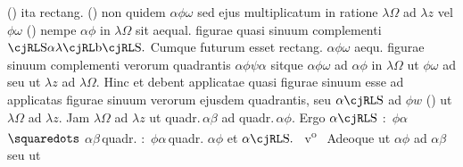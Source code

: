 \phantom(\hspace*{-1.2mm})
ita rectang.
(\phantom)\hspace*{-1.2mm}%
non quidem $\alpha\phi\omega$
sed ejus multiplicatum in ratione $\lambda\varOmega$ ad $\lambda z$ vel
$\phi\omega$%
\phantom(\hspace*{-1.2mm})
nempe $\alpha\phi$ in $\lambda\varOmega$
sit aequal. figurae quasi sinuum complementi\protect{}
$\text{\hebr{S}}\alpha\lambda\text{\hebr{b}}\text{\hebr{S}}.$
Cumque futurum esset rectang.\protect{} $\alpha\phi\omega$ aequ.
figurae sinuum complementi\protect{} verorum
quadrantis $\alpha\phi\psi\alpha$
sitque $\alpha\phi\omega$ ad $\alpha\phi$ in $\lambda\varOmega$
ut $\phi\omega$ ad 
seu ut $\lambda z$ ad $\lambda\varOmega.$
Hinc et debent applicatae quasi figurae sinuum\protect{}
esse ad applicatas figurae sinuum\protect{} verorum
ejusdem quadrantis,\protect{}
seu $\alpha\text{\hebr{S}}$
ad $\phi w$%
\phantom(\hspace*{-1.2mm})
ut $\lambda\varOmega$ ad $\lambda z.$
Jam $\lambda\varOmega$ ad $\lambda z$ ut
quadr.\,$\alpha\beta$ ad quadr.\,$\alpha\phi.$
Ergo $\alpha\text{\hebr{S}}$ \lbrack:\rbrack\ $\phi\alpha$
$\squaredots$
$\alpha\beta$\,quadr. \lbrack:\rbrack\ $\phi\alpha$\,quadr.
$\alpha\phi$ et $\alpha\text{\hebr{S}}.$
%
~v\textsuperscript{o}\rbrack\ %
%
Adeoque ut $\alpha\phi$ ad $\alpha\beta$ seu ut
